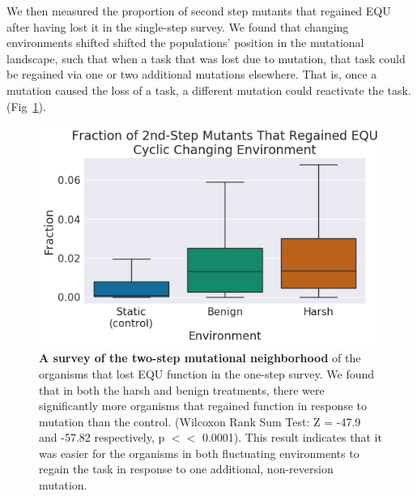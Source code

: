 \documentclass[PhD]{msu-thesis}
\begin{document}
We then measured the proportion of second step mutants that regained EQU after having lost it in the single-step survey. We found that 
changing environments shifted
shifted the populations' position in the mutational landscape, such that when a task that was lost due to mutation, that task could be regained via one or two additional mutations elsewhere. That is, once a mutation caused the loss of a task, a different mutation could reactivate the task. (Fig~\ref{fig:CCE_two_step}). 

	\begin{figure}[!h] %
	\includegraphics[width=0.75\columnwidth]{figures/CE/CCE_frac_2step__box.png}
	\caption{\textbf{A survey of the two-step mutational neighborhood} of the organisms that lost EQU function in the one-step survey. We found that in both the harsh and benign treatments, there were significantly more organisms that regained function in response to mutation than the control. (Wilcoxon Rank Sum Test: Z = -47.9 and -57.82 respectively, p $<<$ 0.0001). This result indicates that it was easier for the organisms in both fluctuating environments to regain the task in response to one additional, non-reversion mutation.   
	}\label{fig:CCE_two_step}
	\end{figure}
\end{document}
